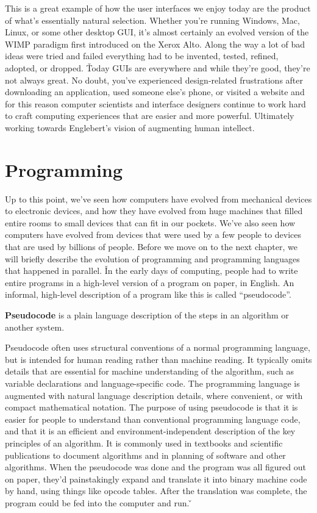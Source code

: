This is a great example of how the user interfaces we enjoy today are the product of what's essentially natural
selection. Whether you're running Windows, Mac, Linux, or some other desktop GUI, it's almost certainly an evolved
version of the WIMP paradigm first introduced on the Xerox Alto. Along the way a lot of bad ideas were tried and
failed everything had to be invented, tested, refined, adopted, or dropped. \v

Today GUIs are everywhere and while they're good, they're not always great. No doubt, you've experienced
design-related frustrations after downloading an application, used someone else's phone, or visited a website and for
this reason computer scientists and interface designers continue to work hard to craft computing experiences that are
easier and more powerful. Ultimately working towards Englebert's vision of augmenting human intellect.

\section{Programming}

Up to this point, we've seen how computers have evolved from mechanical devices to electronic devices, and how they
have evolved from huge machines that filled entire rooms to small devices that can fit in our pockets. We've also
seen how computers have evolved from devices that were used by a few people to devices that are used by billions of
people. Before we move on to the next chapter, we will briefly describe the evolution of programming and programming
languages that happened in parallel. \v

In the early days of computing, people had to write entire programs in a high-level version of a program on paper, in
English. An informal, high-level description of a program like this is called ``pseudocode''.

\bd[Pseudocode]
\textbf{Pseudocode} is a plain language description of the steps in an algorithm or another system.
\ed

Pseudocode often uses structural conventions of a normal programming language, but is intended for human reading
rather than machine reading. It typically omits details that are essential for machine understanding of the algorithm,
such as variable declarations and language-specific code. The programming language is augmented with natural
language description details, where convenient, or with compact mathematical notation. The purpose of using
pseudocode is that it is easier for people to understand than conventional programming language code, and that it is
an efficient and environment-independent description of the key principles of an algorithm. It is commonly used in
textbooks and scientific publications to document algorithms and in planning of software and other algorithms. When
the pseudocode was done and the program was all figured out on paper, they'd painstakingly expand and translate it
into binary machine code by hand, using things like opcode tables. After the translation was complete, the program
could be fed into the computer and run. \v

